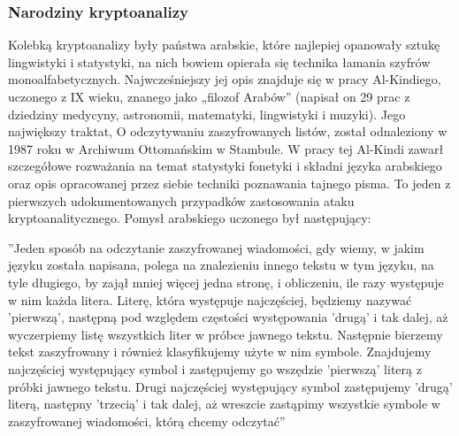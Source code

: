 \documentclass[a4paper, 10pt] {article}
\begin{document}
\subsubsection{Narodziny kryptoanalizy}
Kolebką kryptoanalizy były państwa arabskie, które najlepiej opanowały sztukę lingwistyki i statystyki, na nich bowiem opierała się technika
łamania szyfrów monoalfabetycznych. Najwcześniejszy jej opis znajduje się w pracy Al-Kindiego, uczonego z IX wieku, znanego jako „filozof
Arabów” (napisał on 29 prac z dziedziny medycyny, astronomii, matematyki, lingwistyki i muzyki). Jego
największy traktat, O odczytywaniu zaszyfrowanych listów, został odnaleziony w 1987 roku w Archiwum Ottomańskim w Stambule. W pracy tej Al-Kindi
zawarł szczegółowe rozważania na temat
statystyki fonetyki i składni języka arabskiego oraz opis opracowanej przez siebie techniki poznawania tajnego pisma. To jeden z pierwszych
udokumentowanych przypadków zastosowania ataku
kryptoanalitycznego. Pomysł arabskiego uczonego był następujący:
\begin{center}
”Jeden sposób na odczytanie zaszyfrowanej wiadomości, gdy wiemy, w jakim języku została napisana, polega na znalezieniu innego tekstu w tym języku, na tyle długiego, by zajął mniej więcej jedna stronę, i obliczeniu, ile razy występuje w nim każda litera. Literę, która występuje najczęściej, będziemy nazywać ’pierwszą’, następną pod względem częstości występowania ’drugą’ i tak dalej, aż wyczerpiemy listę wszystkich liter w próbce jawnego tekstu. Następnie bierzemy tekst zaszyfrowany i również klasyfikujemy użyte w nim symbole. Znajdujemy najczęściej występujący symbol i zastępujemy go wszędzie ’pierwszą’ literą z próbki jawnego tekstu. Drugi najczęściej występujący symbol zastępujemy ’drugą’ literą, następny ’trzecią’ i tak dalej, aż wreszcie zastąpimy wszystkie symbole w zaszyfrowanej wiadomości, którą chcemy odczytać” \cite{latexdps2}
\end{center}
\end{document}

